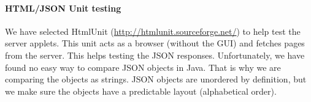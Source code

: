 \documentclass[a4paper]{article}
\begin{document}
\paragraph{HTML/JSON Unit testing}
We have selected HtmlUnit (\url{http://htmlunit.sourceforge.net/}) to help test the server applets. This unit acts as a browser (without the GUI) and fetches pages from the server. This helps testing the JSON responses. 
Unfortunately, we have found no easy way to compare JSON objects in Java. That is why we are comparing the objects as strings. JSON objects are unordered by definition, but we make sure the objects have a predictable layout (alphabetical order).
\end{document}
